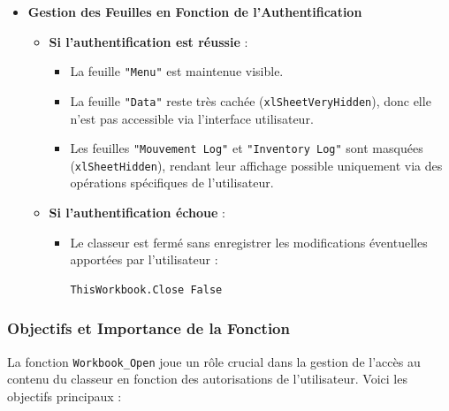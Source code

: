 \documentclass[a4paper, oneside, 12pt, final]{extreport}
\begin{document}
\begin{itemize}
    \item \textbf{Gestion des Feuilles en Fonction de l'Authentification}
    \begin{itemize}
        \item \textbf{Si l'authentification est réussie} :
        \begin{itemize}
            \item La feuille \texttt{"Menu"} est maintenue visible.
            \item La feuille \texttt{"Data"} reste très cachée (\texttt{xlSheetVeryHidden}), donc elle n'est pas accessible via l'interface utilisateur.
            \item Les feuilles \texttt{"Mouvement Log"} et \texttt{"Inventory Log"} sont masquées (\texttt{xlSheetHidden}), rendant leur affichage possible uniquement via des opérations spécifiques de l'utilisateur.
        \end{itemize}

        \item \textbf{Si l'authentification échoue} :
        \begin{itemize}
            \item Le classeur est fermé sans enregistrer les modifications éventuelles apportées par l'utilisateur :
            \begin{lstlisting}
ThisWorkbook.Close False
            \end{lstlisting}
        \end{itemize}
    \end{itemize}
\end{itemize}

\subsubsection{Objectifs et Importance de la Fonction}

La fonction \texttt{Workbook\_Open} joue un rôle crucial dans la gestion de l'accès au contenu du classeur en fonction des autorisations de l'utilisateur. Voici les objectifs principaux :
\end{document}
